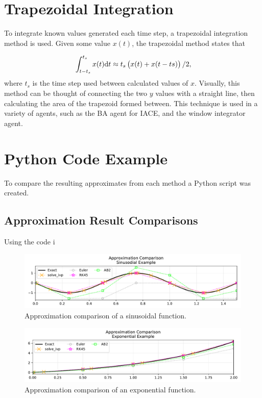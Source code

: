 \documentclass[12pt]{report}
\begin{document}
\section{Trapezoidal Integration}
To integrate known values generated each time step, a trapezoidal integration method is used.
Given some value $x(t)$, the trapezoidal method states that

\begin{equation}{\label{eq: trapezoidal int} }
\int_{t-t_s}^{t_s}x(t) \text{d}t \approx t_s\left( x(t)+x(t-ts) \right)/2,
\end{equation}%
where $t_s$ is the time step used between calculated values of $x$.
Visually, this method can be thought of connecting the two $y$ values with a straight line, then calculating the area of the trapezoid formed between.
This technique is used in a variety of agents, such as the BA agent for IACE, and the window integrator agent. 

\section{Python Code Example}
To compare the resulting approximates from each method a Python script was created.


\subsection{Approximation Result Comparisons}
Using the code i

\begin{figure}[H]
	\centering
	\footnotesize
	\includegraphics[width=\linewidth]{numTech/sinEx}
	\caption{Approximation comparison of a sinusoidal function.}
	\label{fig: sin ex}
\end{figure}

\begin{figure}[H]
	\centering
	\footnotesize
	\includegraphics[width=\linewidth]{numTech/expEx}
	\caption{Approximation comparison of an exponential function.}
	\label{fig: exp ex}
\end{figure}
\end{document}
